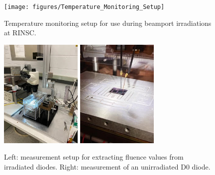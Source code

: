 \begin{figure}[!hbt]
  \begin{center}
    \texttt{[image: figures/Temperature\_Monitoring\_Setup]}
    \caption{Temperature monitoring setup for use during beamport irradiations at RINSC.}
    \label{fig:Temperature_Monitoring_Setup}
  \end{center}
\end{figure}

\begin{figure}[!hbt]
  \begin{center}
    \includegraphics[width=0.35\textwidth]{figures/CVIV_Setup}
    \includegraphics[width=0.35\textwidth]{figures/D0_Measurement}
    \caption{Left: measurement setup for extracting fluence values from irradiated diodes. Right: measurement of an unirradiated D0 diode.}
    \label{fig:Fluence_Measurement_Setup}
  \end{center}
\end{figure}

\fi       %
